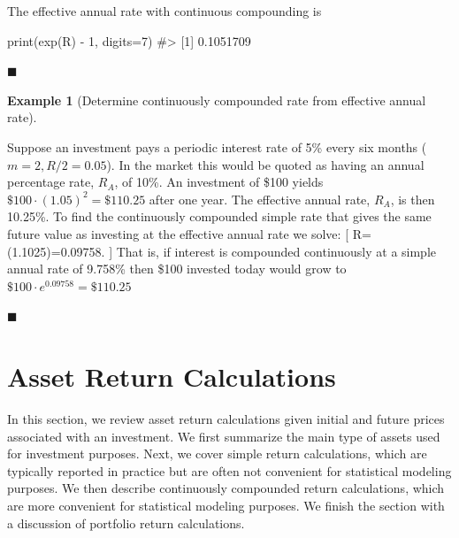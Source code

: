 \documentclass[
  letterpaper,
  DIV=11,
  numbers=noendperiod]{scrreprt}
\newenvironment{Shaded}{\begin{snugshade}}{\end{snugshade}}
\newcommand{\AttributeTok}[1]{\textcolor[rgb]{0.40,0.45,0.13}{#1}}
\newcommand{\CommentTok}[1]{\textcolor[rgb]{0.37,0.37,0.37}{#1}}
\newcommand{\DecValTok}[1]{\textcolor[rgb]{0.68,0.00,0.00}{#1}}
\newcommand{\FunctionTok}[1]{\textcolor[rgb]{0.28,0.35,0.67}{#1}}
\newcommand{\NormalTok}[1]{\textcolor[rgb]{0.00,0.23,0.31}{#1}}
\newcommand{\SpecialCharTok}[1]{\textcolor[rgb]{0.37,0.37,0.37}{#1}}
\theoremstyle{definition}
\theoremstyle{definition}
\newtheorem{example}{Example}[chapter]
\theoremstyle{remark}
\begin{document}
The effective annual rate with continuous compounding is

\begin{Shaded}
\begin{Highlighting}[]
\FunctionTok{print}\NormalTok{(}\FunctionTok{exp}\NormalTok{(R) }\SpecialCharTok{{-}} \DecValTok{1}\NormalTok{, }\AttributeTok{digits=}\DecValTok{7}\NormalTok{)}
\CommentTok{\#\textgreater{} [1] 0.1051709}
\end{Highlighting}
\end{Shaded}

\hfill{}\(\blacksquare\)

\begin{example}[Determine continuously compounded rate from effective
annual
rate]\protect\hypertarget{exm-example0105}{}\label{exm-example0105}

Suppose an investment pays a periodic interest rate of 5\% every six
months (\(m=2,R/2=0.05\)). In the market this would be quoted as having
an annual percentage rate, \(R_{A}\), of 10\%. An investment of \$100
yields \(\$100\cdot(1.05)^{2}=\$110.25\) after one year. The effective
annual rate, \(R_{A}\), is then 10.25\%. To find the continuously
compounded simple rate that gives the same future value as investing at
the effective annual rate we solve: {[} R=\ln(1.1025)=0.09758. {]} That
is, if interest is compounded continuously at a simple annual rate of
9.758\% then \$100 invested today would grow to
\(\$100\cdot e^{0.09758}=\$110.25\)

\end{example}

\hfill{}\(\blacksquare\)

\hypertarget{sec-AssetReturnCalculations}{%
\section{Asset Return Calculations}\label{sec-AssetReturnCalculations}}

In this section, we review asset return calculations given initial and
future prices associated with an investment. We first summarize the main
type of assets used for investment purposes. Next, we cover simple
return calculations, which are typically reported in practice but are
often not convenient for statistical modeling purposes. We then describe
continuously compounded return calculations, which are more convenient
for statistical modeling purposes. We finish the section with a
discussion of portfolio return calculations.
\end{document}
